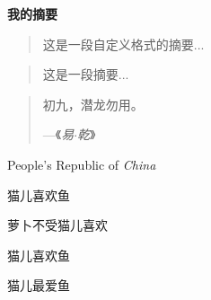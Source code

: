 \documentclass{ctexart}%
\newcommand\PRC{People's Republic of \emph{China}}
\newcommand\loves [2]{#1喜欢#2}
\newcommand\hatedby[2]{#2不受#1喜欢}
\newcommand\love[3][喜欢]{#2#1#3}
\newenvironment{myabstract}[1][摘要]%
{\small
	\begin{center}\bfseries #1 \end{center}%
	\begin{quotation}}%
	{\end{quotation}}
\newenvironment{Quotation}[1]%
{\newcommand\quotesource{#1}%
	\begin{quotation}}%
	{\par\hfill---《\textit{\quotesource}》%
\end{quotation}}
\begin{document}
	\begin{myabstract}[我的摘要]
		这是一段自定义格式的摘要...
	\end{myabstract}
	
	
	\begin{abstract}
		这是一段摘要...
	\end{abstract}
	
	\begin{Quotation}{易$\cdot$乾}
		初九，潜龙勿用。
	\end{Quotation}
	
	
	
	\PRC
	
	\loves{猫儿}{鱼}
	
	\hatedby{猫儿}{萝卜}
	
	\love{猫儿}{鱼}
	
	\love[最爱]{猫儿}{鱼}
\end{document}

